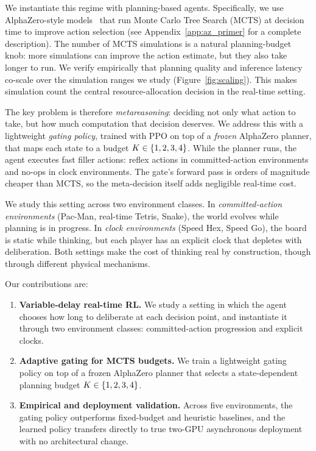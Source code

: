 We instantiate this regime with planning-based agents.
Specifically, we use AlphaZero-style models~\citep{silver2018general} that run
Monte Carlo Tree Search (MCTS) at decision time to improve action selection
(see Appendix~\ref{app:az_primer} for a complete description).
The number of MCTS simulations is a natural planning-budget knob: more
simulations can improve the action estimate, but they also take longer to run.
We verify empirically that planning quality and inference latency co-scale over
the simulation ranges we study (Figure~\ref{fig:scaling}).
This makes simulation count the central resource-allocation decision in the
real-time setting.

The key problem is therefore \emph{metareasoning}: deciding not only what
action to take, but how much computation that decision deserves.
We address this with a lightweight \emph{gating policy}, trained with PPO on
top of a \emph{frozen} AlphaZero planner, that maps each state to a budget
$K \in \{1,2,3,4\}$.
While the planner runs, the agent executes fast filler actions: reflex actions
in committed-action environments and no-ops in clock environments.
The gate's forward pass is orders of magnitude cheaper than MCTS, so the
meta-decision itself adds negligible real-time cost.

We study this setting across two environment classes.
In \emph{committed-action environments} (Pac-Man, real-time Tetris, Snake), the
world evolves while planning is in progress.
In \emph{clock environments} (Speed Hex, Speed Go), the board is static while
thinking, but each player has an explicit clock that depletes with deliberation.
Both settings make the cost of thinking real by construction, though through
different physical mechanisms.

Our contributions are:
\begin{enumerate}
  \item \textbf{Variable-delay real-time RL.}
    We study a setting in which the agent chooses how long to deliberate at
    each decision point, and instantiate it through two environment classes:
    committed-action progression and explicit clocks.
  \item \textbf{Adaptive gating for MCTS budgets.}
    We train a lightweight gating policy on top of a frozen AlphaZero planner
    that selects a state-dependent planning budget $K \in \{1,2,3,4\}$.
  \item \textbf{Empirical and deployment validation.}
    Across five environments, the gating policy outperforms fixed-budget and
    heuristic baselines, and the learned policy transfers directly to true
    two-GPU asynchronous deployment with no architectural change.
\end{enumerate}

